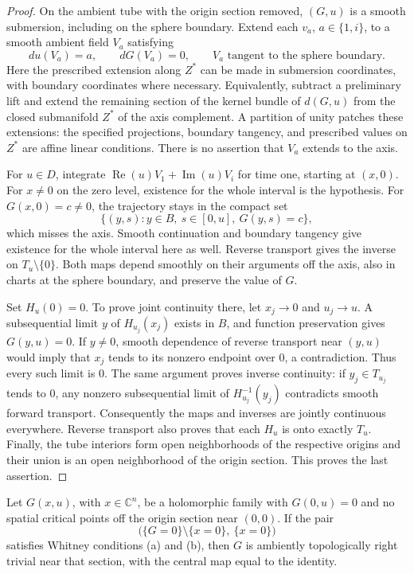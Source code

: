 \begin{proof}
On the ambient tube with the origin section removed, $(G,u)$ is a
smooth submersion, including on the sphere boundary. Extend each $v_a$,
$a\in\{1,i\}$, to a smooth ambient field $V_a$ satisfying
\[
 du(V_a)=a,\qquad dG(V_a)=0,
 \qquad V_a\text{ tangent to the sphere boundary}.
\]
Here the prescribed extension along $Z^*$ can be made in submersion
coordinates, with boundary coordinates where necessary. Equivalently,
subtract a preliminary lift and extend the remaining section of the
kernel bundle of $d(G,u)$ from the closed submanifold $Z^*$ of the axis
complement. A partition of unity patches these extensions: the specified
projections, boundary tangency, and prescribed values on $Z^*$ are affine
linear conditions. There is no assertion that $V_a$ extends to the axis.

For $u\in D$, integrate
$\operatorname{Re}(u)V_1+\operatorname{Im}(u)V_i$ for time one,
starting at $(x,0)$. For $x\ne0$ on the zero level, existence for the
whole interval is the hypothesis. For $G(x,0)=c\ne0$, the trajectory
stays in the compact set
\[
 \{(y,s):y\in B,\ s\in[0,u],\ G(y,s)=c\},
\]
which misses the axis. Smooth continuation and boundary tangency give
existence for the whole interval here as well. Reverse transport gives
the inverse on $T_u\setminus\{0\}$. Both maps depend smoothly on their
arguments off the axis, also in charts at the sphere boundary, and preserve
the value of $G$.

Set $H_u(0)=0$. To prove joint continuity there, let $x_j\to0$ and
$u_j\to u$. A subsequential limit $y$ of $H_{u_j}(x_j)$ exists in $B$,
and function preservation gives $G(y,u)=0$. If $y\ne0$, smooth dependence
of reverse transport near $(y,u)$ would imply that $x_j$ tends to its
nonzero endpoint over $0$, a contradiction. Thus every such limit is $0$.
The same argument proves inverse continuity: if $y_j\in T_{u_j}$ tends
to $0$, any nonzero subsequential limit of $H_{u_j}^{-1}(y_j)$ contradicts
smooth forward transport. Consequently the maps and inverses are jointly
continuous everywhere. Reverse transport also proves that each $H_u$ is
onto exactly $T_u$. Finally, the tube interiors form open neighborhoods of
the respective origins and their union is an open neighborhood of the
origin section. This proves the last assertion.
\end{proof}

\begin{corollary}
\label{cor:whitney-right}
Let $G(x,u)$, with $x\in\mathbb C^n$, be a holomorphic family with
$G(0,u)=0$ and no spatial critical points off the origin section near $(0,0)$. If the pair
\[
 \bigl(\{G=0\}\setminus\{x=0\},\ \{x=0\}\bigr)
\]
satisfies Whitney conditions \textup{(a)} and \textup{(b)}, then $G$ is
ambiently topologically right trivial near that section, with the central
map equal to the identity.
\end{corollary}

